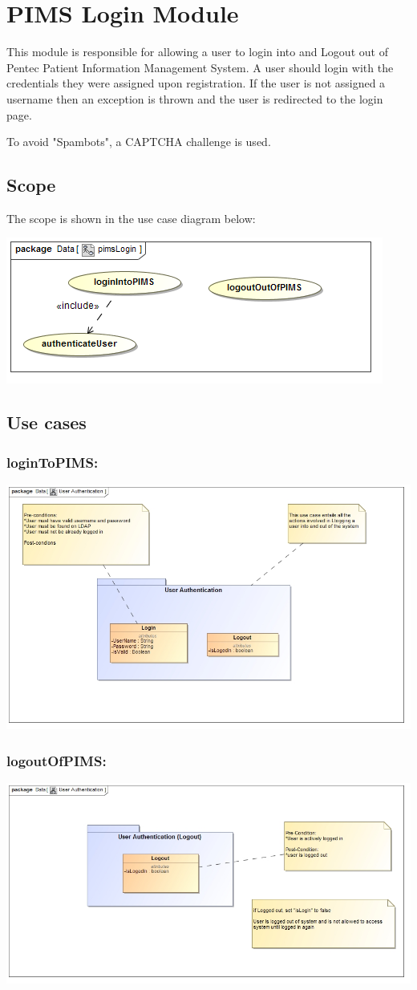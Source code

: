 \section{PIMS Login Module}
This module is responsible for allowing a user to login into and Logout out of Pentec Patient Information Management System. A user should login with the credentials they were assigned upon registration. If the user is not assigned a username then an exception is thrown and the user is redirected to the login page. \par 

To avoid "Spambots", a CAPTCHA challenge is used. 

\subsection{Scope}
The scope is shown in the use case diagram below: \par
\includegraphics[width=0.75\linewidth]{./Graphics/pimsLogin/pimsLogin}

\subsection{Use cases}
	\subsubsection{loginToPIMS:} 
		\includegraphics[width=0.7\linewidth]{./Graphics/Login}
	\subsubsection{logoutOfPIMS:}  
		\includegraphics[width=0.7\linewidth]{./Graphics/Logout}

